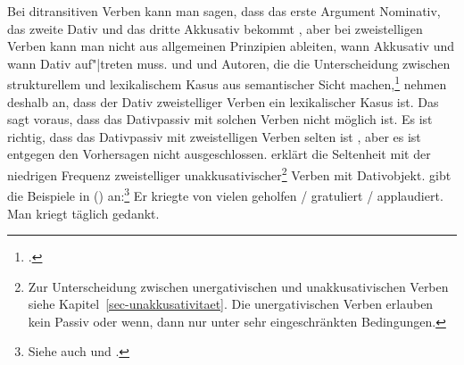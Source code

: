 Bei ditransitiven Verben kann man sagen, dass das erste Argument Nominativ, das zweite
Dativ und das dritte Akkusativ bekommt \citep[49]{Wunderlich97a}, aber bei zweistelligen Verben kann man nicht aus allgemeinen
Prinzipien ableiten, wann Akkusativ und wann Dativ auf"|treten muss.
 und
\citet[]{Stechow90a} und Autoren, die die Unterscheidung zwischen
strukturellem und lexikalischem Kasus aus semantischer Sicht machen,\footnote{
  \textcites[]{Kaufmann95a}[--26]{Stiebels96a}[]{Olsen97c}[, 129]{Rapp97a}[]{Wunderlich97a}.%
}
nehmen deshalb an,
dass der Dativ zweistelliger Verben ein lexikalischer Kasus ist.
Das sagt voraus, dass das Dativpassiv mit solchen Verben nicht möglich ist.
Es ist richtig, dass das Dativpassiv mit zweistelligen Verben selten ist \citep{HW95a},
aber es ist entgegen den Vorhersagen nicht ausgeschlossen.  \citet[]{Wegener90} erklärt die
Seltenheit mit der niedrigen Frequenz zweistelliger unakkusativischer\footnote{ 
  Zur Unterscheidung zwischen unergativischen und unakkusativischen Verben 
  siehe Kapitel~\ref{sec-unakkusativitaet}. Die unergativischen Verben erlauben kein Passiv
  oder wenn, dann nur unter sehr eingeschränkten Bedingungen.%
}
Verben mit Dativobjekt.
\textcites[]{Wegener85a}[]{Wegener90} 
gibt die Beispiele in () an:\footnote{
        Siehe auch  und .
}
\eal
\label{ex-er-kriegte-geholfen}
\ex{}
Er kriegte von vielen geholfen / gratuliert / applaudiert.
\ex{} 
Man kriegt täglich gedankt.
\zl

